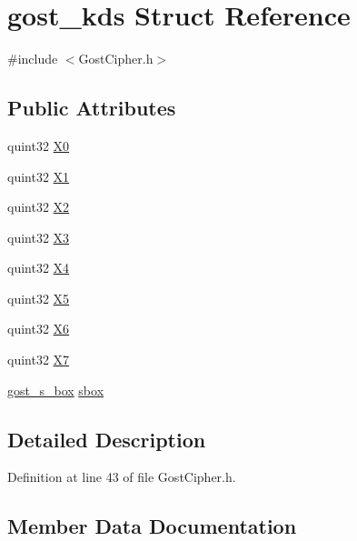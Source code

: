 \hypertarget{structgost__kds}{}\section{gost\+\_\+kds Struct Reference}
\label{structgost__kds}


{\ttfamily \#include $<$Gost\+Cipher.\+h$>$}

\subsection*{Public Attributes}
\begin{DoxyCompactItemize}
\item 
quint32 \hyperlink{structgost__kds_ad279c5ef8dfdd263d9077a6a0754f242}{X0}
\item 
quint32 \hyperlink{structgost__kds_a155ecf738230f808adc83f90db195324}{X1}
\item 
quint32 \hyperlink{structgost__kds_a568f9b4285b08860efa757714dd7bab4}{X2}
\item 
quint32 \hyperlink{structgost__kds_a258c070dbf4f8ed47c422da09e109e3c}{X3}
\item 
quint32 \hyperlink{structgost__kds_a81457c58875d16d72b44b53c2fd9e342}{X4}
\item 
quint32 \hyperlink{structgost__kds_a04a9a487e04ac6567e734c68250dfd7a}{X5}
\item 
quint32 \hyperlink{structgost__kds_a8b94f47ca33e4786266d3f9df1bb7c26}{X6}
\item 
quint32 \hyperlink{structgost__kds_ac19573c51ead337871c20d2559be9e56}{X7}
\item 
\hyperlink{structgost__s__box}{gost\+\_\+s\+\_\+box} \hyperlink{structgost__kds_ada84e57042c8aa1b354d5effbf3188a1}{sbox}
\end{DoxyCompactItemize}


\subsection{Detailed Description}


Definition at line 43 of file Gost\+Cipher.\+h.



\subsection{Member Data Documentation}
\mbox{\label{structgost__kds_ada84e57042c8aa1b354d5effbf3188a1}} 
